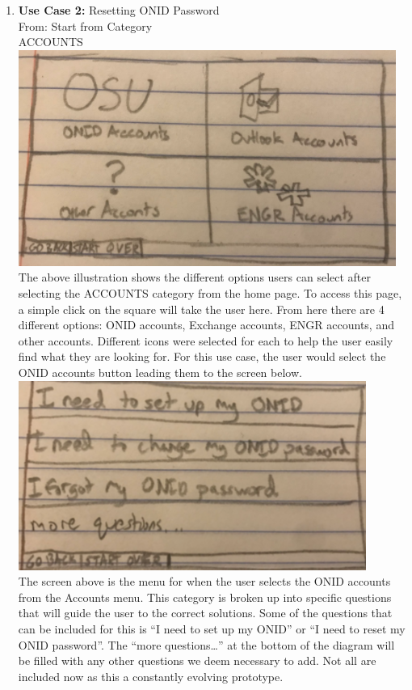 \documentclass[12pt, letterpaper]{article}
\begin{document}
\begin{enumerate}
	\item \textbf{Use Case 2:} Resetting ONID Password
	\\From: Start from Category
	\\ACCOUNTS
	\\\includegraphics[scale=.75]{accounts.png}
	\\The above illustration shows the different options users can select after selecting the ACCOUNTS category from the home page. To access this page, a simple click on the square will take the user here. From here there are 4 different options: ONID accounts, Exchange accounts, ENGR accounts, and other accounts. Different icons were selected for each to help the user easily find what they are looking for. For this use case, the user would select the ONID accounts button leading them to the screen below.
	\\\includegraphics[scale=.75]{accounts_questions.png}	
	\\The screen above is the menu for when the user selects the ONID accounts from the Accounts menu. This category is broken up into specific questions that will guide the user to the correct solutions. Some of the questions that can be included for this is “I need to set up my ONID” or “I need to reset my ONID password”. The “more questions…” at the bottom of the diagram will be filled with any other questions we deem necessary to add. Not all are included now as this a constantly evolving prototype. 

\end{enumerate}
\end{document}
